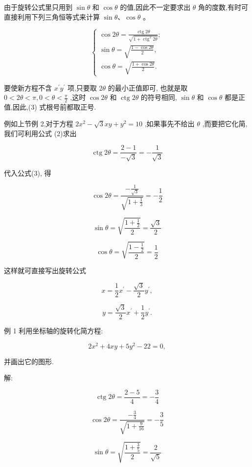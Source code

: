 \documentclass[lang=cn,newtx,10pt,scheme=chinese]{elegantbook}
\begin{document}
由于旋转公式里只用到 \(\sin \theta\) 和 \(\cos \theta\) 的值,因此不一定要求出 \(\theta\) 角的度数,有时可直接利用下列三角恒等式来计算 \(\sin \theta \text{、}\cos \theta\) 。

\[
  \left\{ \begin{array}{l} \cos {2\theta } = \frac{\operatorname{ctg}{2\theta }}{\sqrt{1 + {\operatorname{ctg}}^{2}{2\theta }}}; \\ \sin \theta = \sqrt{\frac{1 - \cos {2\theta }}{2}}, \\ \cos \theta = \sqrt{\frac{1 + \cos {2\theta }}{2}}. \end{array}\right. \tag{3}
\]

要使新方程不含 \({x}^{\prime }{y}^{\prime }\) 项,只要取 \({2\theta }\) 的最小正值即可, 也就是取 \(0 < {2\theta } < \pi ,0 < \theta < \frac{\pi }{2}\) ,这时 \(\cos {2\theta }\) 和 \(\operatorname{ctg}{2\theta }\) 的符号相同, \(\sin \theta\) 和 \(\cos \theta\) 都是正值,因此,(3) 式根号前都取正号.

例如上节例 2,对于方程 \(2{x}^{2} - \sqrt{3}{xy} + {y}^{2} = {10}\) ,如果事先不给出 \(\theta\) ,而要把它化简,我们可利用公式 (2)求出

\[
  \operatorname{ctg}{2\theta } = \frac{2 - 1}{-\sqrt{3}} = - \frac{1}{\sqrt{3}}
\]

代入公式(3), 得

\[
  \cos {2\theta } = \frac{-\frac{1}{\sqrt{3}}}{\sqrt{1 + \frac{1}{3}}} = - \frac{1}{2}
\]

\[
  \sin \theta = \sqrt{\frac{1 + \frac{1}{2}}{2}} = \frac{\sqrt{3}}{2}
\]

\[
  \cos \theta = \sqrt{\frac{1 - \frac{1}{2}}{2}} = \frac{1}{2}
\]

这样就可直接写出旋转公式

\[
  x = \frac{1}{2}{x}^{\prime } - \frac{\sqrt{3}}{2}{y}^{\prime },
\]

\[
  y = \frac{\sqrt{3}}{2}{x}^{\prime } + \frac{1}{2}{y}^{\prime }.
\]

例 1 利用坐标轴的旋转化简方程:

\[
  2{x}^{2} + {4xy} + 5{y}^{2} - {22} = 0,
\]

并画出它的图形.

解:

\[
  \operatorname{ctg}{2\theta } = \frac{2 - 5}{4} = - \frac{3}{4}
\]

\[
  \cos {2\theta } = \frac{-\frac{3}{4}}{\sqrt{1 + \frac{9}{16}}} = - \frac{3}{5}
\]

\[
  \sin \theta = \sqrt{\frac{1 + \frac{3}{5}}{2}} = \frac{2}{\sqrt{5}}
\]
\end{document}
